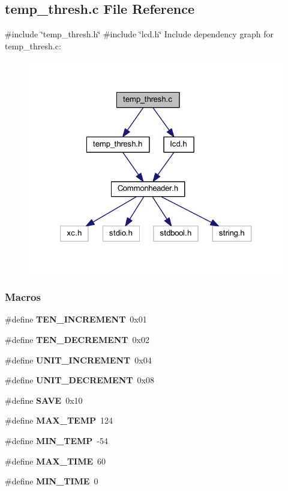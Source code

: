\subsection{temp\+\_\+thresh.\+c File Reference}
\label{a00053}
{\ttfamily \#include \char`\"{}temp\+\_\+thresh.\+h\char`\"{}}\newline
{\ttfamily \#include \char`\"{}lcd.\+h\char`\"{}}\newline
Include dependency graph for temp\+\_\+thresh.\+c\+:
\nopagebreak
\begin{figure}[H]
\begin{center}
\leavevmode
\includegraphics[width=321pt]{a00054}
\end{center}
\end{figure}
\subsubsection*{Macros}
\begin{DoxyCompactItemize}
\item 
\#define \textbf{ T\+E\+N\+\_\+\+I\+N\+C\+R\+E\+M\+E\+NT}~0x01
\item 
\#define \textbf{ T\+E\+N\+\_\+\+D\+E\+C\+R\+E\+M\+E\+NT}~0x02
\item 
\#define \textbf{ U\+N\+I\+T\+\_\+\+I\+N\+C\+R\+E\+M\+E\+NT}~0x04
\item 
\#define \textbf{ U\+N\+I\+T\+\_\+\+D\+E\+C\+R\+E\+M\+E\+NT}~0x08
\item 
\#define \textbf{ S\+A\+VE}~0x10
\item 
\#define \textbf{ M\+A\+X\+\_\+\+T\+E\+MP}~124
\item 
\#define \textbf{ M\+I\+N\+\_\+\+T\+E\+MP}~-\/54
\item 
\#define \textbf{ M\+A\+X\+\_\+\+T\+I\+ME}~60
\item 
\#define \textbf{ M\+I\+N\+\_\+\+T\+I\+ME}~0
\end{DoxyCompactItemize}
